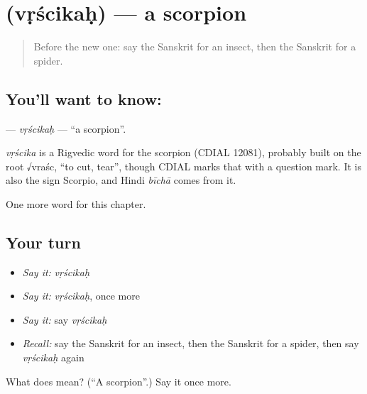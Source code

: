 \section[\texorpdfstring{\sk{वृश्चिकः} (vṛścikaḥ)}{वृश्चिकः (vṛścikaḥ)}]{ (vṛścikaḥ) — a scorpion}

\label{lesson:SA-C253-vrscikah}



\begin{quote}
Before the new one: say the Sanskrit for an insect, then the Sanskrit for a spider.
\end{quote}

\subsection*{You'll want to know: }
\textbf{} — \emph{vṛścikaḥ} — \textquotedblleft{}a scorpion\textquotedblright{}.

\begin{cousinweb}
\emph{vṛścika} is a Rigvedic word for the scorpion (CDIAL 12081), probably built on the root √vraśc, \textquotedblleft{}to cut, tear\textquotedblright{}, though CDIAL marks that with a question mark. It is also the sign Scorpio, and Hindi \emph{bīchā} comes from it.
\end{cousinweb}

\begin{grammarlens}[title={What you've built}]
One more word for this chapter.
\end{grammarlens}

\subsection*{Your turn}
\begin{itemize}
\raggedright
  \item \emph{Say it:} \emph{vṛścikaḥ}
  \item \emph{Say it:} \emph{vṛścikaḥ}, once more
  \item \emph{Say it:} say \emph{vṛścikaḥ}
  \item \emph{Recall:} say the Sanskrit for an insect, then the Sanskrit for a spider, then say \emph{vṛścikaḥ} again
\end{itemize}

\begin{tcolorbox}[breakable,colback=teal!4,colframe=teal!35!black,title={Before you move on}]
What does  mean? (\textquotedblleft{}A scorpion\textquotedblright{}.) Say it once more.
\end{tcolorbox}
